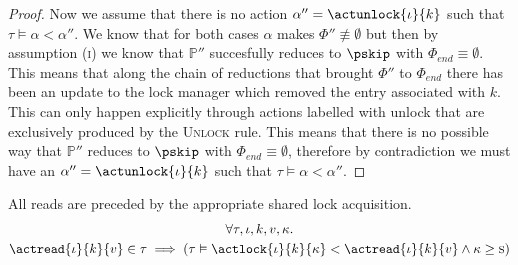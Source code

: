 \begin{proof}
Now we assume that there is no action $\alpha'' = \actunlock{\iota}{k}$ such that $\tau \vDash \alpha < \alpha ''$. We know that for both cases $\alpha$ makes $\Phi'' \not\equiv \emptyset$ but then by assumption (\textsc{i}) we know that $\mathds{P}''$ succesfully reduces to $\pskip$ with $\Phi_{end} \equiv \emptyset$. This means that along the chain of reductions that brought $\Phi''$ to $\Phi_{end}$ there has been an update to the lock manager which removed the entry associated with $k$. This can only happen explicitly through actions labelled with \textsf{unlock} that are exclusively produced by the \textsc{Unlock} rule. This means that there is no possible way that $\mathds{P}''$ reduces to $\pskip$ with $\Phi_{end} \equiv \emptyset$, therefore by contradiction we must have an $\alpha'' = \actunlock{\iota}{k}$ such that $\tau \vDash \alpha < \alpha ''$.
\end{proof}

\lem \label{lem:read} All reads are preceded by the appropriate shared lock acquisition.
\begin{gather*}
\forall \tau, \iota, k, v, \kappa \ldotp \\
\actread{\iota}{k}{v} \in \tau \implies \left( \tau \vDash \actlock{\iota}{k}{\kappa} < \actread{\iota}{k}{v} \land \kappa \geq \textsc{s} \right)
\end{gather*}

